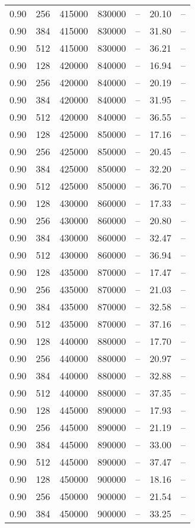 \begin{tabular}{l|l|l|l|l|l|l}
0.90 & 256 & 415000 & 830000 & -- & 20.10 & --\\
0.90 & 384 & 415000 & 830000 & -- & 31.80 & --\\
0.90 & 512 & 415000 & 830000 & -- & 36.21 & --\\
0.90 & 128 & 420000 & 840000 & -- & 16.94 & --\\
0.90 & 256 & 420000 & 840000 & -- & 20.19 & --\\
0.90 & 384 & 420000 & 840000 & -- & 31.95 & --\\
0.90 & 512 & 420000 & 840000 & -- & 36.55 & --\\
0.90 & 128 & 425000 & 850000 & -- & 17.16 & --\\
0.90 & 256 & 425000 & 850000 & -- & 20.45 & --\\
0.90 & 384 & 425000 & 850000 & -- & 32.20 & --\\
0.90 & 512 & 425000 & 850000 & -- & 36.70 & --\\
0.90 & 128 & 430000 & 860000 & -- & 17.33 & --\\
0.90 & 256 & 430000 & 860000 & -- & 20.80 & --\\
0.90 & 384 & 430000 & 860000 & -- & 32.47 & --\\
0.90 & 512 & 430000 & 860000 & -- & 36.94 & --\\
0.90 & 128 & 435000 & 870000 & -- & 17.47 & --\\
0.90 & 256 & 435000 & 870000 & -- & 21.03 & --\\
0.90 & 384 & 435000 & 870000 & -- & 32.58 & --\\
0.90 & 512 & 435000 & 870000 & -- & 37.16 & --\\
0.90 & 128 & 440000 & 880000 & -- & 17.70 & --\\
0.90 & 256 & 440000 & 880000 & -- & 20.97 & --\\
0.90 & 384 & 440000 & 880000 & -- & 32.88 & --\\
0.90 & 512 & 440000 & 880000 & -- & 37.35 & --\\
0.90 & 128 & 445000 & 890000 & -- & 17.93 & --\\
0.90 & 256 & 445000 & 890000 & -- & 21.19 & --\\
0.90 & 384 & 445000 & 890000 & -- & 33.00 & --\\
0.90 & 512 & 445000 & 890000 & -- & 37.47 & --\\
0.90 & 128 & 450000 & 900000 & -- & 18.16 & --\\
0.90 & 256 & 450000 & 900000 & -- & 21.54 & --\\
0.90 & 384 & 450000 & 900000 & -- & 33.25 & --\\

\end{tabular}
